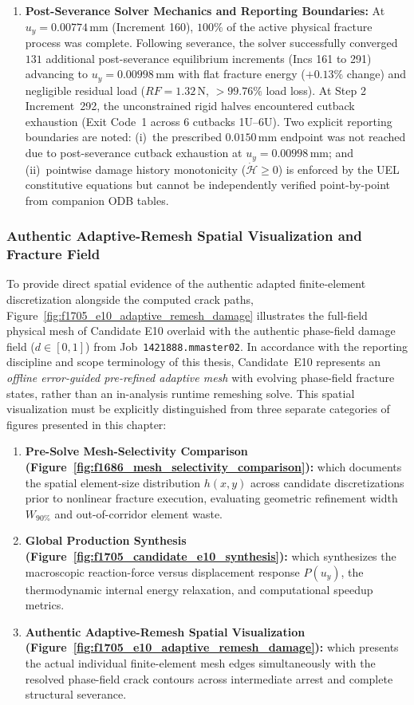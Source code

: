 \begin{enumerate}
  \item \textbf{Post-Severance Solver Mechanics and Reporting Boundaries:} At $u_y = 0.00774\,\mathrm{mm}$ (Increment 160), $100\%$ of the active physical fracture process was complete. Following severance, the solver successfully converged $131$ additional post-severance equilibrium increments (Incs 161 to 291) advancing to $u_y = 0.00998\,\mathrm{mm}$ with flat fracture energy ($+0.13\%$ change) and negligible residual load ($RF = 1.32\,\mathrm{N}$, $>99.76\%$ load loss). At Step 2 Increment~292, the unconstrained rigid halves encountered cutback exhaustion (Exit Code~1 across 6 cutbacks 1U--6U). Two explicit reporting boundaries are noted: (i)~the prescribed $0.0150\,\mathrm{mm}$ endpoint was not reached due to post-severance cutback exhaustion at $u_y = 0.00998\,\mathrm{mm}$; and (ii)~pointwise damage history monotonicity ($\dot{\mathcal{H}} \ge 0$) is enforced by the UEL constitutive equations but cannot be independently verified point-by-point from companion ODB tables.
\end{enumerate}

\subsubsection{Authentic Adaptive-Remesh Spatial Visualization and Fracture Field}
\label{subsubsec:f1705_e10_remesh_visualization}

To provide direct spatial evidence of the authentic adapted finite-element discretization alongside the computed crack paths, Figure~\ref{fig:f1705_e10_adaptive_remesh_damage} illustrates the full-field physical mesh of Candidate E10 overlaid with the authentic phase-field damage field ($d \in [0, 1]$) from Job~\texttt{1421888.mmaster02}. In accordance with the reporting discipline and scope terminology of this thesis, Candidate~E10 represents an \emph{offline error-guided pre-refined adaptive mesh} with evolving phase-field fracture states, rather than an in-analysis runtime remeshing solve. This spatial visualization must be explicitly distinguished from three separate categories of figures presented in this chapter:
\begin{enumerate}
  \item \textbf{Pre-Solve Mesh-Selectivity Comparison (Figure~\ref{fig:f1686_mesh_selectivity_comparison}):} which documents the spatial element-size distribution $h(x, y)$ across candidate discretizations prior to nonlinear fracture execution, evaluating geometric refinement width $W_{90\%}$ and out-of-corridor element waste.
  \item \textbf{Global Production Synthesis (Figure~\ref{fig:f1705_candidate_e10_synthesis}):} which synthesizes the macroscopic reaction-force versus displacement response $P(u_y)$, the thermodynamic internal energy relaxation, and computational speedup metrics.
  \item \textbf{Authentic Adaptive-Remesh Spatial Visualization (Figure~\ref{fig:f1705_e10_adaptive_remesh_damage}):} which presents the actual individual finite-element mesh edges simultaneously with the resolved phase-field crack contours across intermediate arrest and complete structural severance.
\end{enumerate}

